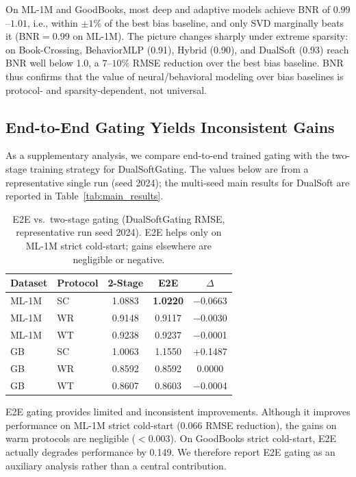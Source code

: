 \documentclass[journal]{IEEEtran}
\begin{document}
On ML-1M and GoodBooks, most deep and adaptive models achieve BNR of $0.99$--$1.01$, i.e., within $\pm1\%$ of the best bias baseline, and only SVD marginally beats it (BNR$=$0.99 on ML-1M). The picture changes sharply under extreme sparsity: on Book-Crossing, BehaviorMLP (0.91), Hybrid (0.90), and DualSoft (0.93) reach BNR well below 1.0, a $7$--$10\%$ RMSE reduction over the best bias baseline. BNR thus confirms that the value of neural/behavioral modeling over bias baselines is protocol- and sparsity-dependent, not universal.

\subsection{End-to-End Gating Yields Inconsistent Gains}
\label{sec:e2e}

As a supplementary analysis, we compare end-to-end trained gating with the two-stage training strategy for DualSoftGating. The values below are from a representative single run (seed 2024); the multi-seed main results for DualSoft are reported in Table~\ref{tab:main_results}.

\begin{table}[!t]
\centering
\caption{E2E vs.\ two-stage gating (DualSoftGating RMSE, representative run seed 2024). E2E helps only on ML-1M strict cold-start; gains elsewhere are negligible or negative.}
\label{tab:e2e}
\footnotesize
\begin{tabular}{@{}llccc@{}}
\toprule
Dataset & {Protocol} & {2-Stage} & {E2E} & {$\Delta$} \\
\midrule
ML-1M & SC & 1.0883 & \textbf{1.0220} & $-$0.0663 \\
ML-1M & WR & 0.9148 & 0.9117          & $-$0.0030 \\
ML-1M & WT & 0.9238 & 0.9237          & $-$0.0001 \\
GB    & SC & 1.0063 & 1.1550          & +0.1487  \\
GB    & WR & 0.8592 & 0.8592          & 0.0000   \\
GB    & WT & 0.8607 & 0.8603          & $-$0.0004 \\
\bottomrule
\end{tabular}
\end{table}

E2E gating provides limited and inconsistent improvements. Although it improves performance on ML-1M strict cold-start (0.066 RMSE reduction), the gains on warm protocols are negligible ($<0.003$). On GoodBooks strict cold-start, E2E actually degrades performance by 0.149. We therefore report E2E gating as an auxiliary analysis rather than a central contribution.
\end{document}
